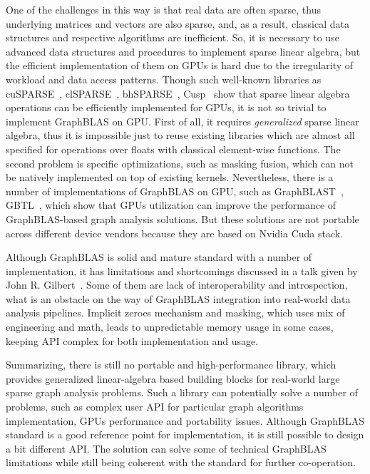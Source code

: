One of the challenges in this way is that real data are often sparse, thus underlying matrices and vectors are also sparse, and, as a result, classical data structures and respective algorithms are inefficient. So, it is necessary to use advanced data structures and procedures to implement sparse linear algebra, but the efficient implementation of them on GPUs is hard due to the irregularity of workload and data access patterns. Though such well-known libraries as cuSPARSE~\cite{net:cusparse_docs}, clSPARSE~\cite{article:clsparse}, bhSPARSE~\cite{article:bhsparse}, Cusp~\cite{net:cusplibrary} show that sparse linear algebra operations can be efficiently implemented for GPUs, it is not so trivial to implement GraphBLAS on GPU. First of all, it requires \textit{generalized} sparse linear algebra, thus it is impossible just to reuse existing libraries which are almost all specified for operations over floats with classical element-wise functions. The second problem is specific optimizations, such as masking fusion, which can not be natively implemented on top of existing kernels. Nevertheless, there is a number of implementations of GraphBLAS on GPU, such as GraphBLAST~\cite{yang2019graphblast}, GBTL~\cite{article:gbtl}, which show that GPUs utilization can improve the performance of GraphBLAS-based graph analysis solutions. But these solutions are not portable across different device vendors because they are based on Nvidia Cuda stack.

Although GraphBLAS is solid and mature standard with a number of implementation, it has limitations and shortcomings discussed in a talk given by John R. Gilbert~\cite{talk:graphblas_did_wrong}. Some of them are lack of interoperability and introspection, what is an obstacle on the way of GraphBLAS integration into real-world data analysis pipelines. Implicit zeroes mechanism and masking, which uses mix of engineering and math, leads to unpredictable memory usage in some cases, keeping API complex for both implementation and usage.

Summarizing, there is still no portable and high-performance library, which provides generalized linear-algebra based building blocks for real-world large sparse graph analysis problems. Such a library can potentially solve a number of problems, such as complex user API for particular graph algorithms implementation, GPUs performance and portability issues. Although GraphBLAS standard is a good reference point for implementation, it is still possible to design a bit different API. The solution can solve some of technical GraphBLAS limitations while still being coherent with the standard for further co-operation.  